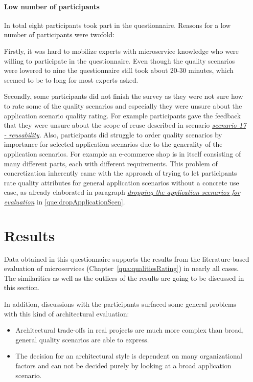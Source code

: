\paragraph{Low number of participants}
In total eight participants took part in the questionnaire. 
Reasons for a low number of participants were twofold:

Firstly, it was hard to mobilize experts with microservice knowledge who were willing to participate in the questionnaire.
Even though the quality scenarios were lowered to nine the questionnaire still took about 20-30 minutes, which seemed to be to long for most experts asked.

Secondly, some participants did not finish the survey as they were not sure how to rate some of the quality scenarios and especially they were unsure about the application scenario quality rating.
For example participants gave the feedback that they were unsure about the scope of reuse described in scenario \textit{\hyperref[quaMicro:s17]{scenario 17 - reusability}}.
Also, participants did struggle to order quality scenarios by importance for selected application scenarios due to the generality of the application scenarios. 
For example an e-commerce shop is in itself consisting of many different parts, each with different requirements. 
This problem of concretization inherently came with the approach of trying to let participants rate quality attributes for general application scenarios without a concrete use case, as already elaborated in paragraph \textit{\hyperref[que:dropApplicationScen]{dropping the application scenarios for evaluation}} in \ref{que:dropApplicationScen}.

\section{Results}
\label{res:overview}

Data obtained in this questionnaire supports the results from the literature-based evaluation of microservices (Chapter~\ref{qua:qualitiesRating}) in nearly all cases.
The similarities as well as the outliers of the results are going to be discussed in this section.

In addition, discussions with the participants surfaced some general problems with this kind of architectural evaluation:
\begin{itemize}
\item Architectural trade-offs in real projects are much more complex than broad, general quality scenarios are able to express.
\item The decision for an architectural style is dependent on many organizational factors and can not be decided purely by looking at a broad application scenario.
\end{itemize}

